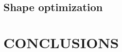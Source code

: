 \documentclass[a4paper]{eccomas_paper-2024}
\begin{document}

\subsection{Shape optimization} %
\label{sub:Shape optimization}


\section{CONCLUSIONS} %
\label{sec:conclusions}





%     
\end{document}
